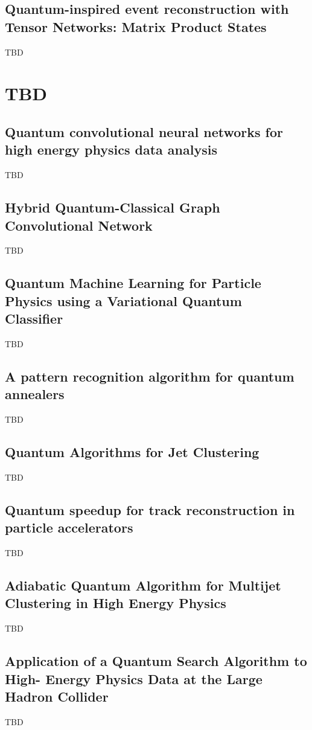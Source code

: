 \subsection{Quantum-inspired event reconstruction with Tensor Networks: Matrix Product States~\cite{Araz:2021zwu}}
TBD


\section{TBD}

\subsection{Quantum convolutional neural networks for high energy physics data analysis~\cite{Chen:2020zkj}}
TBD
\subsection{Hybrid Quantum-Classical Graph Convolutional Network~\cite{Chen:2021ouz}}
TBD
\subsection{Quantum Machine Learning for Particle Physics using a Variational Quantum Classifier~\cite{Blance:2020nhl}}
TBD
\subsection{A pattern recognition algorithm for quantum annealers~\cite{Bapst:2019llh}}
TBD
\subsection{Quantum Algorithms for Jet Clustering~\cite{Wei:2019rqy}}
TBD
\subsection{Quantum speedup for track reconstruction in particle accelerators~\cite{Magano:2021jzd}}
TBD
\subsection{Adiabatic Quantum Algorithm for Multijet Clustering in High Energy Physics~\cite{Pires:2020urc}}
TBD
\subsection{Application of a Quantum Search Algorithm to High- Energy Physics Data at the Large Hadron Collider~\cite{Armenakas:2020ymp}}
TBD
